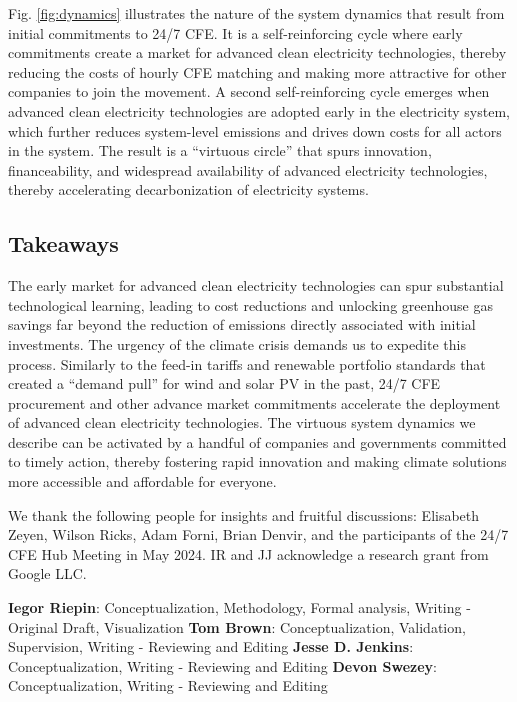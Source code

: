 \documentclass[pdflatex,sn-basic, Numbered]{sn-jnl}
\theoremstyle{thmstyleone}%
\theoremstyle{thmstyletwo}%
\theoremstyle{thmstylethree}%
\begin{document}
Fig. \ref{fig:dynamics} illustrates the nature of the system dynamics that result from initial commitments to 24/7 CFE. It is a self-reinforcing cycle where early commitments create a market for advanced clean electricity technologies, thereby reducing the costs of hourly CFE matching and making more attractive for other companies to join the movement. A second self-reinforcing cycle emerges when advanced clean electricity technologies are adopted early in the electricity system, which further reduces system-level emissions and drives down costs for all actors in the system. The result is a \enquote{virtuous circle} that spurs innovation, financeability, and widespread availability of advanced electricity technologies, thereby accelerating decarbonization of electricity systems.

\subsection*{Takeaways}\label{sec6}

The early market for advanced clean electricity technologies can spur substantial technological learning, leading to cost reductions and unlocking greenhouse gas savings far beyond the reduction of emissions directly associated with initial investments.
The urgency of the climate crisis demands us to expedite this process.
Similarly to the feed-in tariffs and renewable portfolio standards that created a \enquote{demand pull} for wind and solar PV in the past, 24/7 CFE procurement and other advance market commitments \cite{GoogleMicrosoftNucor} accelerate the deployment of advanced clean electricity technologies.
The virtuous system dynamics we describe can be activated by a handful of companies and governments committed to timely action, thereby fostering rapid innovation and making climate solutions more accessible and affordable for everyone.

\backmatter

 We thank the following people for insights and fruitful discussions: Elisabeth Zeyen, Wilson Ricks, Adam Forni, Brian Denvir, and the participants of the 24/7 CFE Hub Meeting in May 2024. IR and JJ acknowledge a research grant from Google LLC.

\textbf{Iegor Riepin}: Conceptualization, Methodology, Formal analysis, Writing - Original Draft, Visualization
\textbf{Tom Brown}: Conceptualization, Validation, Supervision, Writing - Reviewing and Editing
\textbf{Jesse D. Jenkins}: Conceptualization, Writing - Reviewing and Editing
\textbf{Devon Swezey}: Conceptualization, Writing - Reviewing and Editing
\end{document}
